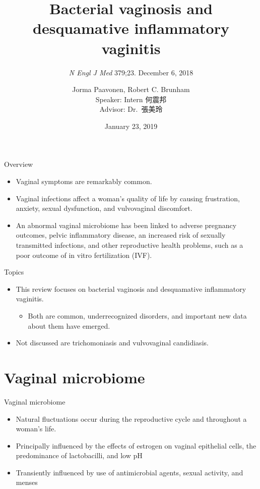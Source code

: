 \documentclass{beamer}
\title[Vaginitis]{Bacterial vaginosis and desquamative inflammatory vaginitis}
\subtitle{\textit{N Engl J Med} 379;23.  December 6, 2018}
\author[何震邦]{
    Jorma Paavonen\inst{1}, Robert C. Brunham\inst{2} \\[1ex]
    Speaker: Intern 何震邦 \\
    Advisor: Dr.~張美玲
}
\institute[CGH]{
    \inst{1} Helsinki University Hospital \\
    \inst{2} University of British Columbia \\[1ex]
    Cathay General Hospital
}
\date{January 23, 2019}
\begin{document}
\maketitle

\begin{frame}{Overview}
    \begin{itemize}
        \item Vaginal symptoms are remarkably common.
        \item Vaginal infections affect a woman's quality of life by causing
              frustration, anxiety, sexual dysfunction, and vulvovaginal
              discomfort.
        \item An abnormal vaginal microbiome has been linked to adverse
              pregnancy outcomes, pelvic inflammatory disease, an increased
              risk of sexually transmitted infections, and other reproductive
              health problems, such as a poor outcome of in vitro fertilization
              (IVF).
    \end{itemize}
\end{frame}

\begin{frame}{Topics}
    \begin{itemize}
        \item This review focuses on bacterial vaginosis and desquamative inflammatory vaginitis.
            \begin{itemize}
                \item Both are common, underrecognized disorders, and important new data about them have emerged.
            \end{itemize}
        \item Not discussed are trichomoniasis and vulvovaginal candidiasis.
    \end{itemize}
\end{frame}

\section{Vaginal microbiome}
\begin{frame}{Vaginal microbiome}
    \begin{itemize}
        \item Natural fluctuations occur during the reproductive cycle and
              throughout a woman's life.
        \item Principally influenced by the effects of estrogen on vaginal
              epithelial cells, the predominance of lactobacilli, and low pH
        \item Transiently influenced by use of antimicrobial agents, sexual
              activity, and menses
    \end{itemize}
\end{frame}
\end{document}

